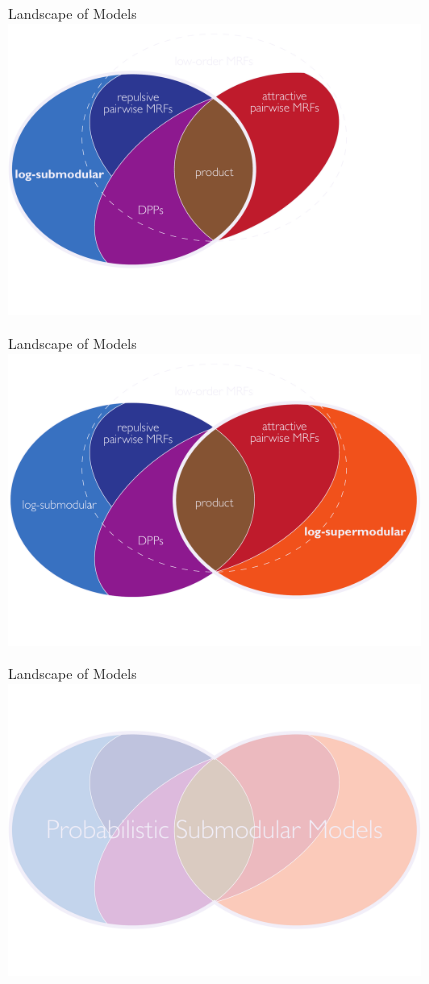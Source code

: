 \begin{frame}{Landscape of Models}
\vspace{0.5em}
\centering
\includegraphics[width=4.3in]{figures/venn06.pdf}
\end{frame}

\begin{frame}{Landscape of Models}
\vspace{0.5em}
\centering
\includegraphics[width=4.3in]{figures/venn07.pdf}
\end{frame}

\begin{frame}{Landscape of Models}
\vspace{0.5em}
\centering
\includegraphics[width=4.3in]{figures/venn08.pdf}
\end{frame}